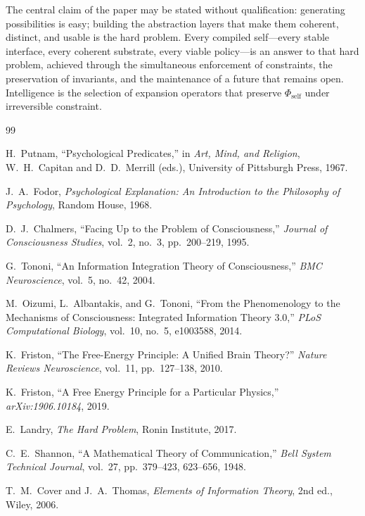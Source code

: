 \documentclass[12pt, a4paper]{article}
\theoremstyle{plain}
\theoremstyle{definition}
\theoremstyle{remark}
\begin{document}
The central claim of the paper may be stated without qualification: generating possibilities is easy; building the abstraction layers that make them coherent, distinct, and usable is the hard problem. Every compiled self---every stable interface, every coherent substrate, every viable policy---is an answer to that hard problem, achieved through the simultaneous enforcement of constraints, the preservation of invariants, and the maintenance of a future that remains open. Intelligence is the selection of expansion operators that preserve $\Phi_{\mathrm{self}}$ under irreversible constraint.

\begin{thebibliography}{99}

H.~Putnam,
``Psychological Predicates,''
in \emph{Art, Mind, and Religion}, W.~H.~Capitan and D.~D.~Merrill (eds.),
University of Pittsburgh Press, 1967.

J.~A.~Fodor,
\emph{Psychological Explanation: An Introduction to the Philosophy of Psychology},
Random House, 1968.

D.~J.~Chalmers,
``Facing Up to the Problem of Consciousness,''
\emph{Journal of Consciousness Studies}, vol.~2, no.~3, pp.~200--219, 1995.

G.~Tononi,
``An Information Integration Theory of Consciousness,''
\emph{BMC Neuroscience}, vol.~5, no.~42, 2004.

M.~Oizumi, L.~Albantakis, and G.~Tononi,
``From the Phenomenology to the Mechanisms of Consciousness: Integrated Information Theory 3.0,''
\emph{PLoS Computational Biology}, vol.~10, no.~5, e1003588, 2014.

K.~Friston,
``The Free-Energy Principle: A Unified Brain Theory?''
\emph{Nature Reviews Neuroscience}, vol.~11, pp.~127--138, 2010.

K.~Friston,
``A Free Energy Principle for a Particular Physics,''
\emph{arXiv:1906.10184}, 2019.

E.~Landry,
\emph{The Hard Problem},
Ronin Institute, 2017.

C.~E.~Shannon,
``A Mathematical Theory of Communication,''
\emph{Bell System Technical Journal}, vol.~27, pp.~379--423, 623--656, 1948.

T.~M.~Cover and J.~A.~Thomas,
\emph{Elements of Information Theory},
2nd ed., Wiley, 2006.


\end{thebibliography}
\end{document}
